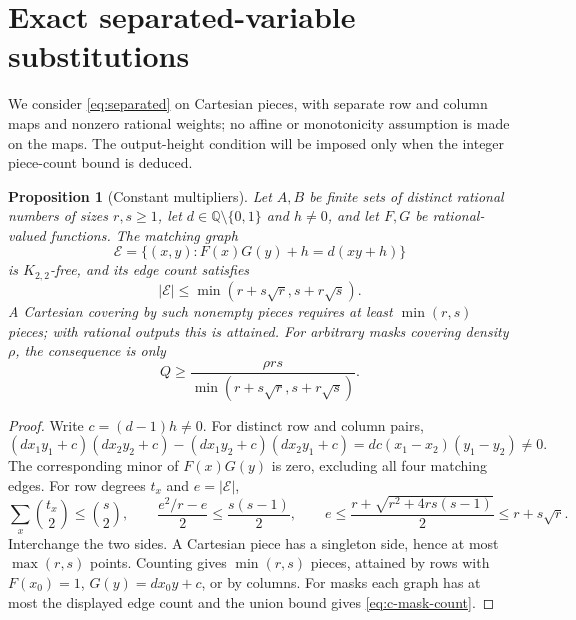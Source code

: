 \documentclass[11pt]{article}
\newtheorem{proposition}[theorem]{Proposition}
\theoremstyle{definition}
\theoremstyle{remark}
\numberwithin{equation}{section}
\newcommand{\Q}{\mathbb Q}
\begin{document}
\section{Exact separated-variable substitutions}\label{sec:pieces}
We consider \eqref{eq:separated} on Cartesian pieces, with separate row and column maps and nonzero
rational weights; no affine or monotonicity assumption is made on the maps.
The output-height condition will be imposed only when the integer piece-count bound is deduced.
\begin{proposition}[Constant multipliers]\label{prop:c-constant}
Let $A,B$ be finite sets of distinct rational numbers of sizes $r,s\ge1$, let
$d\in\Q\setminus\{0,1\}$ and $h\ne0$, and let $F,G$ be rational-valued functions.
The matching graph
\begin{equation}\label{eq:c-constant-graph}
 \mathcal E=\{(x,y):F(x)G(y)+h=d(xy+h)\}
\end{equation}
is $K_{2,2}$-free, and its edge count satisfies
\begin{equation}\label{eq:c-constant-edges}
 |\mathcal E|\le\min(r+s\sqrt r,s+r\sqrt s).
\end{equation}
A Cartesian covering by such nonempty pieces requires at least $\min(r,s)$ pieces; with rational
outputs this is attained. For arbitrary masks covering density $\rho$, the consequence is only
\begin{equation}\label{eq:c-mask-count}
 Q\ge\frac{\rho rs}{\min(r+s\sqrt r,s+r\sqrt s)}.
\end{equation}
\end{proposition}
\begin{proof}
Write $c=(d-1)h\ne0$. For distinct row and column pairs,
\begin{equation}\label{eq:c-constant-minor}
 (dx_1y_1+c)(dx_2y_2+c)-(dx_1y_2+c)(dx_2y_1+c)
 =dc(x_1-x_2)(y_1-y_2)\ne0.
\end{equation}
The corresponding minor of $F(x)G(y)$ is zero, excluding all four matching edges.
For row degrees $t_x$ and $e=|\mathcal E|$,
\begin{equation}\label{eq:c-degree-count}
 \sum_x\binom{t_x}{2}\le\binom s2,\qquad
 \frac{e^2/r-e}{2}\le\frac{s(s-1)}2,\qquad
 e\le\frac{r+\sqrt{r^2+4rs(s-1)}}2\le r+s\sqrt r.
\end{equation}
Interchange the two sides. A Cartesian piece has a singleton side, hence at most $\max(r,s)$ points.
Counting gives $\min(r,s)$ pieces, attained by rows with
$F(x_0)=1$, $G(y)=dx_0y+c$, or by columns.
For masks each graph has at most the displayed edge count and the union bound gives \eqref{eq:c-mask-count}.
\end{proof}
\end{document}
